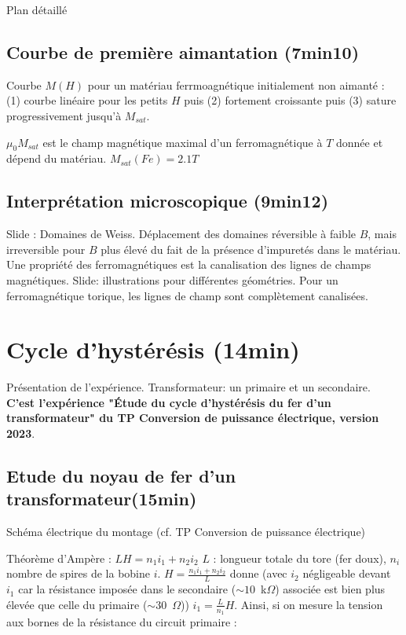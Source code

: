 \begin{reportBlock}{Plan détaillé}
\subsection{Courbe de première aimantation (7min10)}

Courbe $M(H)$ pour un matériau ferrmoagnétique initialement non aimanté : (1) courbe linéaire pour les petits $H$ puis (2) fortement croissante puis (3) sature progressivement jusqu'à $M_{sat}$.

$\mu_0 M_{sat}$ est le champ magnétique maximal d'un ferromagnétique à $T$ donnée et dépend du matériau. $M_{sat}(Fe) = 2.1 T$


\subsection{Interprétation microscopique (9min12)}
Slide : Domaines de Weiss. Déplacement des domaines réversible à faible $B$, mais irreversible pour $B$ plus élevé du fait de la présence d'impuretés dans le matériau.\\

Une propriété des ferromagnétiques est la canalisation des lignes de champs magnétiques. Slide: illustrations pour différentes géométries. Pour un ferromagnétique torique, les lignes de champ sont complètement canalisées.

\section{Cycle d'hystérésis (14min)}

Présentation de l'expérience. Transformateur: un primaire et un secondaire. \textbf{C'est l'expérience "Étude du cycle d'hystérésis du fer d'un transformateur" du TP Conversion de puissance électrique, version 2023}.

\subsection{Etude du noyau de fer d'un transformateur(15min)}

Schéma électrique du montage (cf. TP Conversion de puissance électrique)

Théorème d'Ampère : $L H = n_1 i_1 + n_2 i_2$
$L$ : longueur totale du tore (fer doux), $n_i$ nombre de spires de la bobine $i$. $H = \frac{n_1 i_1 + n_2 i_2}{L}$ donne (avec $i_2$ négligeable devant $i_1$ car la résistance imposée dans le secondaire ($\sim 10$~k$\Omega$) associée est bien plus élevée que celle du primaire ($\sim 30$~$\Omega$)) $i_1 = \frac{L}{n_1} H$. Ainsi, si on mesure la tension aux bornes de la résistance du circuit primaire : 


\end{reportBlock}
